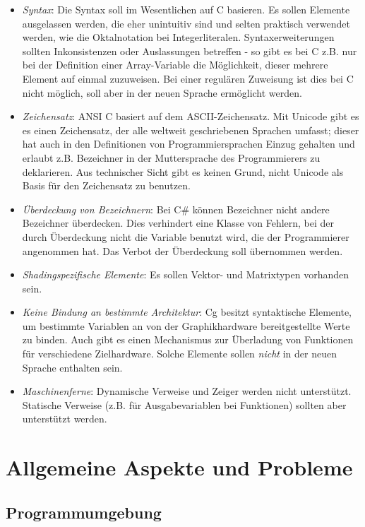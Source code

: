 \begin{itemize}
\item \emph{Syntax}: Die Syntax soll im Wesentlichen auf C basieren. Es sollen Elemente ausgelassen werden, die eher 
unintuitiv sind und selten praktisch verwendet werden, wie die Oktalnotation bei Integerliteralen.
Syntaxerweiterungen sollten Inkonsistenzen oder Auslassungen betreffen - so gibt es bei C z.B. 
nur bei der Definition einer Array-Variable die Möglichkeit, dieser mehrere Element auf einmal zuzuweisen.
Bei einer regulären Zuweisung ist dies bei C nicht möglich, soll aber in der neuen Sprache ermöglicht werden.
\item \emph{Zeichensatz}: ANSI C basiert auf dem ASCII-Zeichensatz. %
Mit Unicode gibt es es einen Zeichensatz, der alle weltweit geschriebenen Sprachen umfasst; dieser
hat auch in den Definitionen von Programmiersprachen Einzug gehalten %
und erlaubt z.B. Bezeichner in der Muttersprache des Programmierers zu deklarieren.
Aus technischer Sicht gibt es keinen Grund, nicht Unicode als Basis für den Zeichensatz zu benutzen.
\item \emph{Überdeckung von Bezeichnern}: Bei C\# können Bezeichner nicht andere Bezeichner überdecken. Dies
verhindert eine Klasse von Fehlern, bei der durch Überdeckung nicht die Variable benutzt wird, die der
Programmierer angenommen hat. Das Verbot der Überdeckung soll übernommen werden.
\item \emph{Shadingspezifische Elemente}: Es sollen Vektor- und Matrixtypen vorhanden sein.
\item \emph{Keine Bindung an bestimmte Architektur}: Cg besitzt syntaktische Elemente, um bestimmte Variablen an
von der Graphikhardware bereitgestellte Werte zu binden. Auch gibt es einen Mechanismus zur Überladung von Funktionen
für verschiedene Zielhardware. Solche Elemente sollen \emph{nicht} in der neuen Sprache enthalten sein.
\item \emph{Maschinenferne}: Dynamische Verweise und 
Zeiger werden nicht unterstützt. Statische Verweise (z.B. für Ausgabevariablen bei Funktionen) sollten aber unterstützt
werden.
\end{itemize}

\newpage

\section{Allgemeine Aspekte und Probleme}

\subsection{Programmumgebung}


